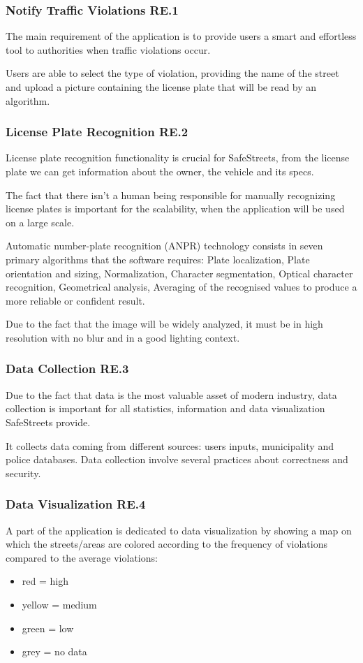 \subsubsection{Notify Traffic Violations RE.1}
The main requirement of the application is to provide users a smart and effortless tool to authorities when traffic violations occur.

Users are able to select the type of violation, providing the name of the street and upload a picture containing the license plate that will be read by an algorithm.

\subsubsection{License Plate Recognition RE.2}
License plate recognition functionality is crucial for SafeStreets, from the license plate we can get information about the owner, the vehicle and its specs.

The fact that there isn't a human being responsible for manually recognizing license plates is important for the scalability, when the application will be used on a large scale.

Automatic number-plate recognition (ANPR) technology consists in seven primary algorithms that the software requires: Plate localization, Plate orientation and sizing, Normalization, Character segmentation, Optical character recognition, Geometrical analysis, Averaging of the recognised values to produce a more reliable or confident result.

Due to the fact that the image will be widely analyzed, it must be in high resolution with no blur and in a good lighting context.

\subsubsection{Data Collection RE.3}
Due to the fact that data is the most valuable asset of modern industry, data collection is important for all statistics, information and data visualization SafeStreets provide.

It collects data coming from different sources: users inputs, municipality and police databases.
Data collection involve several practices about correctness and security.

\subsubsection{Data Visualization RE.4}
A part of the application is dedicated to data visualization by showing a map on which the streets/areas are colored according to the frequency of violations compared to the average violations: 
\begin{itemize}
\item red = high
\item yellow = medium
\item green = low
\item grey = no data
\end{itemize}


